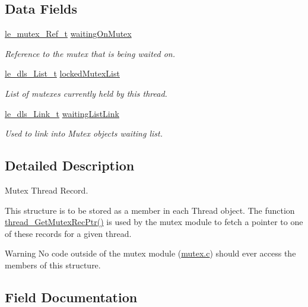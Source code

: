 \subsection*{Data Fields}
\begin{DoxyCompactItemize}
\item 
\hyperlink{le__mutex_8h_ab2af11e2077e6bed9962eb7dfd54eb03}{le\+\_\+mutex\+\_\+\+Ref\+\_\+t} \hyperlink{structmutex___thread_rec__t_ad24966766d75804e6c3dc38bba4e6c99}{waiting\+On\+Mutex}
\begin{DoxyCompactList}\small\item\em Reference to the mutex that is being waited on. \end{DoxyCompactList}\item 
\hyperlink{structle__dls___list__t}{le\+\_\+dls\+\_\+\+List\+\_\+t} \hyperlink{structmutex___thread_rec__t_aaf177668057eb3a75e26c2175e5590c5}{locked\+Mutex\+List}
\begin{DoxyCompactList}\small\item\em List of mutexes currently held by this thread. \end{DoxyCompactList}\item 
\hyperlink{structle__dls___link__t}{le\+\_\+dls\+\_\+\+Link\+\_\+t} \hyperlink{structmutex___thread_rec__t_a2e4c4ef6832e484e25f4802fc4bba33b}{waiting\+List\+Link}
\begin{DoxyCompactList}\small\item\em Used to link into Mutex object\textquotesingle{}s waiting list. \end{DoxyCompactList}\end{DoxyCompactItemize}


\subsection{Detailed Description}
Mutex Thread Record.

This structure is to be stored as a member in each Thread object. The function \hyperlink{thread_8c_adeb861f6f893d73375d4817a1a8a5fcc}{thread\+\_\+\+Get\+Mutex\+Rec\+Ptr()} is used by the mutex module to fetch a pointer to one of these records for a given thread.

\begin{DoxyWarning}{Warning}
No code outside of the mutex module (\hyperlink{mutex_8c}{mutex.\+c}) should ever access the members of this structure. 
\end{DoxyWarning}


\subsection{Field Documentation}
